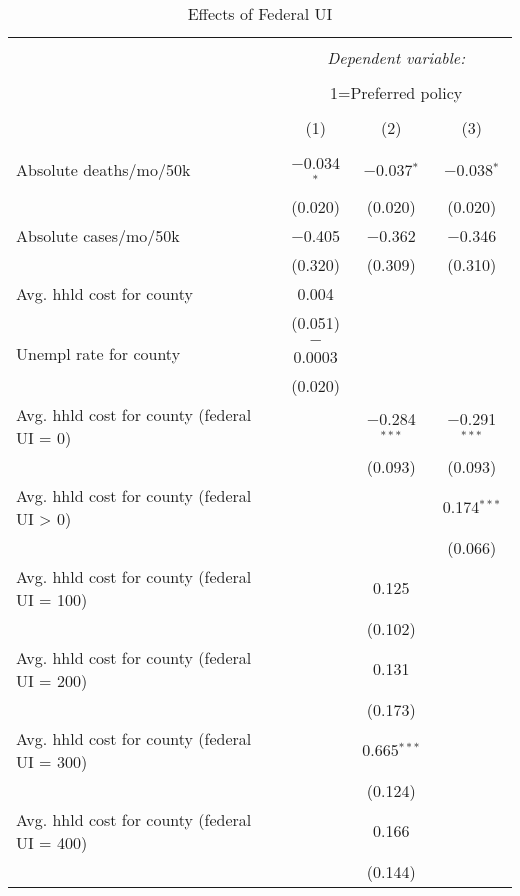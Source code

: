 
\begin{table}[!htbp] \centering 
 \scriptsize 
  \caption{Effects of Federal UI} 
  \label{} 
\begin{tabular}{@{\extracolsep{5pt}}lccc} 
\\[-1.8ex]\hline 
\hline \\[-1.8ex] 
 & \multicolumn{3}{c}{\textit{Dependent variable:}} \\ 
\cline{2-4} 
\\[-1.8ex] & \multicolumn{3}{c}{1=Preferred policy} \\ 
\\[-1.8ex] & (1) & (2) & (3)\\ 
\hline \\[-1.8ex] 
 Absolute deaths/mo/50k & $-$0.034$^{*}$ & $-$0.037$^{*}$ & $-$0.038$^{*}$ \\ 
  & (0.020) & (0.020) & (0.020) \\ 
  Absolute cases/mo/50k & $-$0.405 & $-$0.362 & $-$0.346 \\ 
  & (0.320) & (0.309) & (0.310) \\ 
  Avg. hhld cost for county & 0.004 &  &  \\ 
  & (0.051) &  &  \\ 
  Unempl rate for county & $-$0.0003 &  &  \\ 
  & (0.020) &  &  \\ 
  Avg. hhld cost for county (federal UI = 0) &  & $-$0.284$^{***}$ & $-$0.291$^{***}$ \\ 
  &  & (0.093) & (0.093) \\ 
  Avg. hhld cost for county (federal UI > 0) &  &  & 0.174$^{***}$ \\ 
  &  &  & (0.066) \\ 
  Avg. hhld cost for county (federal UI = 100) &  & 0.125 &  \\ 
  &  & (0.102) &  \\ 
  Avg. hhld cost for county (federal UI = 200) &  & 0.131 &  \\ 
  &  & (0.173) &  \\ 
  Avg. hhld cost for county (federal UI = 300) &  & 0.665$^{***}$ &  \\ 
  &  & (0.124) &  \\ 
  Avg. hhld cost for county (federal UI = 400) &  & 0.166 &  \\ 
  &  & (0.144) &  \\ 

\end{tabular}
\end{table}
